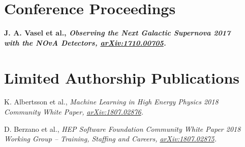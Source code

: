 \documentclass[11pt]{cv}
\begin{document}
\begin{cv}
\section{Conference Proceedings}
\begin{etaremune}
  \item \bf J. A. Vasel \rm et al., \it Observing the Next Galactic Supernova \rm \hfill 2017 \\
  \it with the NOvA Detectors, \rm \href{http://arxiv.org/abs/arXiv:1710.00705}{arXiv:1710.00705}.
\end{etaremune}


\section{Limited Authorship Publications}
\begin{etaremune}
  \item K. Albertsson et al., \it Machine Learning in High Energy Physics \rm \hfill 2018 \\
  \it Community White Paper, \rm \href{https://arxiv.org/abs/1807.02876}{arXiv:1807.02876}.
  \item D. Berzano et al., \it HEP Software Foundation Community White Paper \rm \hfill 2018 \\
  \it Working Group -- Training, Staffing and Careers, \rm \href{https://arxiv.org/abs/1807.02875}{arXiv:1807.02875}.
\end{etaremune}



\end{cv}
\end{document}
